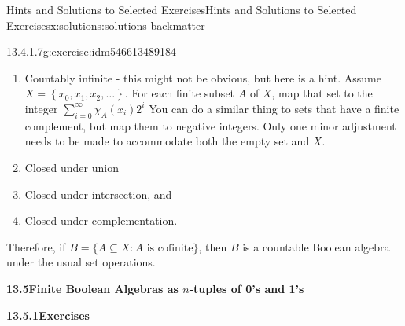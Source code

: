 \documentclass[oneside,10pt,]{book}
\newcommand{\blocktitlefont}{\relax}
\numberwithin{equation}{section}
\begin{document}
\begin{solutions-chapter}{Hints and Solutions to Selected Exercises}{}{Hints and Solutions to Selected Exercises}{}{}{x:solutions:solutions-backmatter}
\begin{divisionsolution}{13.4.1.7}{}{g:exercise:idm546613489184}
\begin{enumerate}[label=(\alph*)]
\item{}Countably infinite - this might not be obvious, but here is a hint.  Assume \(X=\left\{x_0,x_1,x_2,\ldots \right\}\).  For each finite subset \(A\) of \(X\),  map that set to the integer \(\sum _{i=0}^{\infty } \chi _A \left(x_i\right)2^i\) You can do a similar thing to sets that have a finite complement, but map them to negative integers.  Only one minor adjustment needs to be made to accommodate both the empty set and \(X\).%
\item{}Closed under union%
\item{}Closed under intersection, and%
\item{}Closed under complementation.%
\end{enumerate}
Therefore, if \(B =\{A \subseteq  X : A \textrm{ is cofinite}\}\), then \(B\) is a countable Boolean algebra under the usual set operations.%
\end{divisionsolution}%
%
\par\smallskip
\noindent\textbf{\Large{}13.5\space\textperiodcentered\space{}Finite Boolean Algebras as \(n\)-tuples of 0's and 1's}
\par\smallskip
\par\smallskip
\noindent\textbf{\Large{}13.5.1\space\textperiodcentered\space{}Exercises}
\par\smallskip
{}
\end{solutions-chapter}
\end{document}

